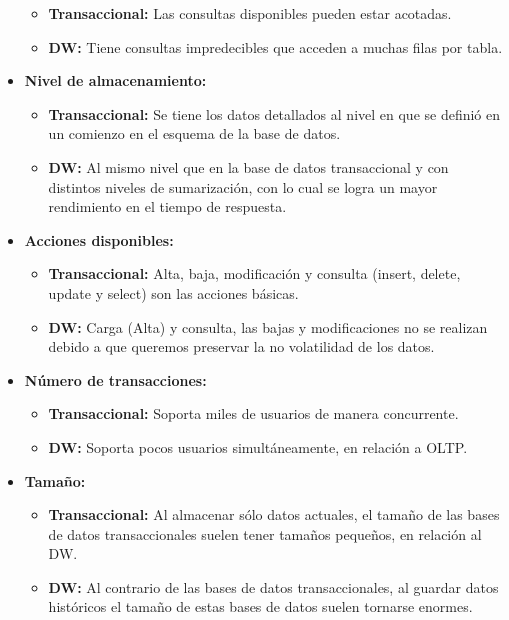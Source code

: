 \documentclass[a4paper,11pt]{article}
\begin{document}
\begin{flushleft}
\begin{itemize}
\begin{itemize}
          \item \textbf{Transaccional:} Las consultas disponibles pueden estar acotadas.
          \item \textbf{DW:} Tiene consultas impredecibles que acceden a muchas filas por tabla.
        \end{itemize}
      \item \textbf{Nivel de almacenamiento:}
        \begin{itemize}
          \item \textbf{Transaccional:} Se tiene los datos detallados al nivel en que se definió en un comienzo en el esquema de la base de datos.
          \item \textbf{DW:} Al mismo nivel que en la base de datos transaccional y con distintos niveles de sumarización, con lo cual se logra un mayor
          rendimiento en el tiempo de respuesta.
        \end{itemize}
      \item \textbf{Acciones disponibles:}
        \begin{itemize}
          \item \textbf{Transaccional:} Alta, baja, modificación y consulta (insert, delete, update y select) son las acciones básicas.
          \item \textbf{DW:} Carga (Alta) y consulta, las bajas y modificaciones no se realizan debido a que queremos preservar la no volatilidad de los
          datos.
        \end{itemize}
      \item \textbf{Número de transacciones:}
        \begin{itemize}
          \item \textbf{Transaccional:} Soporta miles de usuarios de manera concurrente.
          \item \textbf{DW:} Soporta pocos usuarios simultáneamente, en relación a  OLTP.
        \end{itemize}
      \item \textbf{Tamaño:}
        \begin{itemize}
          \item \textbf{Transaccional:} Al almacenar sólo datos actuales, el tamaño de las bases de datos transaccionales suelen tener tamaños pequeños,
          en relación al DW.
          \item \textbf{DW:} Al contrario de las bases de datos transaccionales, al guardar datos históricos el tamaño de estas bases de datos suelen
          tornarse enormes.

\end{itemize}
\end{itemize}
\end{flushleft}
\end{document}
